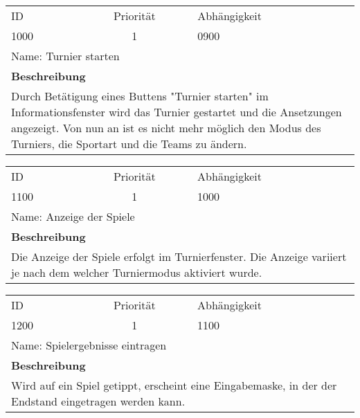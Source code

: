 	\begin{tabularx}{\textwidth}{|l|c|l|}
		\hline
		ID & Priorität & Abhängigkeit \\
		1000 & 1 & 0900\\
		\hline
		\multicolumn{3}{|l|}{Name: Turnier starten} \\
		\hline
		\multicolumn{3}{|l|}{\textbf{Beschreibung}}\\
		\multicolumn{3}{|X|}{Durch Betätigung eines Buttens "Turnier starten" im Informationsfenster wird das Turnier gestartet und die Ansetzungen angezeigt. Von nun an ist es nicht mehr möglich den Modus des Turniers, die Sportart und die Teams zu ändern. }\\
		\hline		 
	\end{tabularx}
	
	\begin{tabularx}{\textwidth}{|l|c|l|}
		\hline
		ID & Priorität & Abhängigkeit \\
		1100 & 1 & 1000\\
		\hline
		\multicolumn{3}{|l|}{Name: Anzeige der Spiele} \\
		\hline
		\multicolumn{3}{|l|}{\textbf{Beschreibung}}\\
		\multicolumn{3}{|X|}{Die Anzeige der Spiele erfolgt im Turnierfenster. Die Anzeige variiert je nach dem welcher Turniermodus aktiviert wurde.}\\
		\hline		 
	\end{tabularx}
	
	\begin{tabularx}{\textwidth}{|l|c|l|}
		\hline
		ID & Priorität & Abhängigkeit \\
		1200 & 1 & 1100\\
		\hline
		\multicolumn{3}{|l|}{Name: Spielergebnisse eintragen} \\
		\hline
		\multicolumn{3}{|l|}{\textbf{Beschreibung}}\\
		\multicolumn{3}{|X|}{Wird auf ein Spiel getippt, erscheint eine Eingabemaske, in der der Endstand eingetragen werden kann.}\\
		\hline		 
	\end{tabularx}
	
